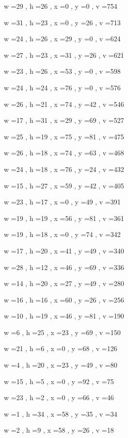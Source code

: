 \documentclass[11pt]{article}
\begin{document}
w =29 , h =26 , x =0 , y =0 , v =754
\par
w =31 , h =23 , x =0 , y =26 , v =713
\par
w =24 , h =26 , x =29 , y =0 , v =624
\par
w =27 , h =23 , x =31 , y =26 , v =621
\par
w =23 , h =26 , x =53 , y =0 , v =598
\par
w =24 , h =24 , x =76 , y =0 , v =576
\par
w =26 , h =21 , x =74 , y =42 , v =546
\par
w =17 , h =31 , x =29 , y =69 , v =527
\par
w =25 , h =19 , x =75 , y =81 , v =475
\par
w =26 , h =18 , x =74 , y =63 , v =468
\par
w =24 , h =18 , x =76 , y =24 , v =432
\par
w =15 , h =27 , x =59 , y =42 , v =405
\par
w =23 , h =17 , x =0 , y =49 , v =391
\par
w =19 , h =19 , x =56 , y =81 , v =361
\par
w =19 , h =18 , x =0 , y =74 , v =342
\par
w =17 , h =20 , x =41 , y =49 , v =340
\par
w =28 , h =12 , x =46 , y =69 , v =336
\par
w =14 , h =20 , x =27 , y =49 , v =280
\par
w =16 , h =16 , x =60 , y =26 , v =256
\par
w =10 , h =19 , x =46 , y =81 , v =190
\par
w =6 , h =25 , x =23 , y =69 , v =150
\par
w =21 , h =6 , x =0 , y =68 , v =126
\par
w =4 , h =20 , x =23 , y =49 , v =80
\par
w =15 , h =5 , x =0 , y =92 , v =75
\par
w =23 , h =2 , x =0 , y =66 , v =46
\par
w =1 , h =34 , x =58 , y =35 , v =34
\par
w =2 , h =9 , x =58 , y =26 , v =18
\par
\newpage
\end{document}
